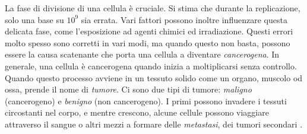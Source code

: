 La fase di divisione di una cellula è cruciale. Si stima che durante la replicazione, solo una base su $10^9$ \cite{DNAReplication} sia errata. Vari fattori possono inoltre influenzare questa delicata fase, come l'esposizione ad agenti chimici ed irradiazione. Questi errori molto spesso sono corretti in vari modi, ma quando questo non basta, possono essere la causa scatenante che porta una cellula a diventare \textit{cancerogena}. In generale, una cellula è cancerogena quando inizia a moltiplicarsi senza controllo. Quando questo processo avviene in un tessuto solido come un organo, muscolo od ossa, prende il nome di \textit{tumore}. Ci sono due tipi di tumore: \textit{maligno} (cancerogeno) e \textit{benigno} (non cancerogeno). I primi possono invadere i tessuti circostanti nel corpo, e mentre crescono, alcune cellule possono viaggiare attraverso il sangue o altri mezzi a formare delle \textit{metastasi}, dei tumori secondari \cite{differencecancertumor:online}.